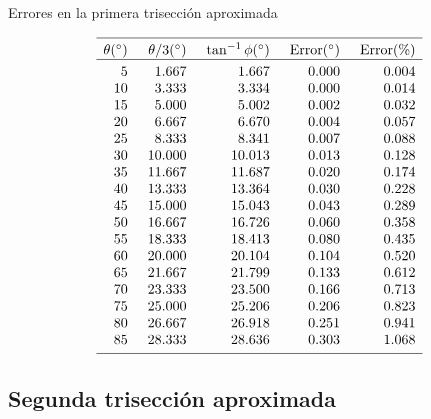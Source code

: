 \begin{table}[t]
\caption{Errores en la primera trisección aproximada}\label{t.trisect-first}
\[
%
\begin{array}{r@{\hspace{5mm}}r@{\hspace{5mm}}r@{\hspace{5mm}}r@{\hspace{5mm}}r}
\hline
\noalign{\smallskip}
\theta ({}^\circ) & \theta/3 ({}^\circ)& \tan^{-1} \phi ({}^\circ) & \mathrm{Error} ({}^\circ) & \mathrm{Error (\%)}\\\hline
\noalign{\smallskip}
  5 &    1.667 &    1.667  &     0.000 &    0.004 \\
 10 &    3.333 &    3.334  &     0.000 &    0.014 \\
 15 &    5.000 &    5.002  &     0.002 &    0.032 \\
 20 &    6.667 &    6.670  &     0.004 &    0.057 \\
 25 &    8.333 &    8.341  &     0.007 &    0.088 \\
 30 &   10.000 &   10.013  &     0.013 &    0.128 \\
 35 &   11.667 &   11.687  &     0.020 &    0.174 \\
 40 &   13.333 &   13.364  &     0.030 &    0.228 \\
 45 &   15.000 &   15.043  &     0.043 &    0.289 \\
 50 &   16.667 &   16.726  &     0.060 &    0.358 \\
 55 &   18.333 &   18.413  &     0.080 &    0.435 \\
 60 &   20.000 &   20.104  &     0.104 &    0.520 \\
 65 &   21.667 &   21.799  &     0.133 &    0.612 \\
 70 &   23.333 &   23.500  &     0.166 &    0.713 \\
 75 &   25.000 &   25.206  &     0.206 &    0.823 \\
 80 &   26.667 &   26.918  &     0.251 &    0.941 \\
 85 &   28.333 &   28.636  &     0.303 &    1.068 \\
 \noalign{\smallskip}
 \hline
 \end{array}
\]
\end{table}

\subsection{Segunda trisección aproximada}

